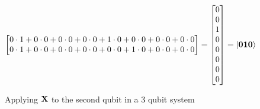 \begin{figure}[H]
\begin{align*}
\begin{bmatrix}
            0\cdot 1 + 0\cdot 0 + 0\cdot 0 + 0\cdot 0 + 1\cdot 0 + 0\cdot 0 + 0\cdot 0 + 0\cdot 0\\
            0\cdot 1 + 0\cdot 0 + 0\cdot 0 + 0\cdot 0 + 0\cdot 0 + 1\cdot 0 + 0\cdot 0 + 0\cdot 0\\
        \end{bmatrix}
        =
        \begin{bmatrix}
            0\\
            0\\
            1\\
            0\\
            0\\
            0\\
            0\\
            0
        \end{bmatrix}
        &=
        \ket{\mathbf{0}\mathbf{1}\mathbf{0}}\\
    \end{align*}
    \caption{Applying $\mathbf{X}$ to the second qubit in a 3 qubit system}
    \label{fig:app_individual_application2}
\end{figure}
